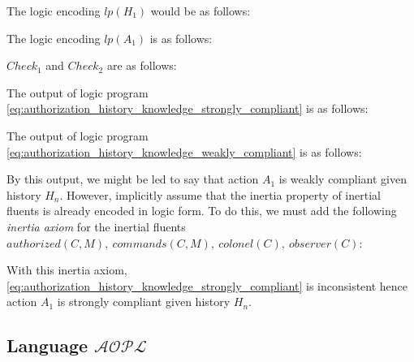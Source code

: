 The logic encoding $lp(H_1)$ would be as follows\footnotemark:



The logic encoding $lp(A_1)$ is as follows:


$Check_1$ and $Check_2$ are as follows:



The output of logic program \cref{eq:authorization_history_knowledge_strongly_compliant} is as follows:


The output of logic program \cref{eq:authorization_history_knowledge_weakly_compliant} is as follows:


By this output, we might be led to say that action $A_1$ is weakly compliant given history $H_n$.
However, \citet{gelfond_authorization_2008} implicitly assume that the inertia property of inertial fluents is already encoded in logic form.
To do this, we must add the following \textit{inertia axiom} for the inertial fluents $authorized(C,M),\ commands(C,M),\ colonel(C),\ observer(C)$:


With this inertia axiom, \cref{eq:authorization_history_knowledge_strongly_compliant} is inconsistent hence action $A_1$ is strongly compliant given history $H_n$.




\subsection{Language $\mathcal{AOPL}$}
\label{subsec:aopl}

